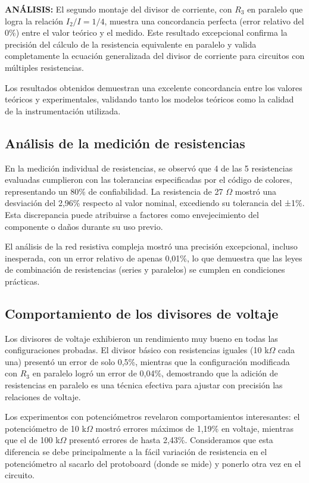 \documentclass[12pt,a4paper]{article}
\begin{document}
\textbf{ANÁLISIS:} El segundo montaje del divisor de corriente, con $R_3$ en paralelo que logra la relación $I_2/I = 1/4$, muestra una concordancia perfecta (error relativo del 0\%) entre el valor teórico y el medido. Este resultado excepcional confirma la precisión del cálculo de la resistencia equivalente en paralelo y valida completamente la ecuación generalizada del divisor de corriente para circuitos con múltiples resistencias.
\bigskip

\newpage
{}
Los resultados obtenidos demuestran una excelente concordancia entre los valores teóricos y experimentales, validando tanto los modelos teóricos como la calidad de la instrumentación utilizada.

\subsection{Análisis de la medición de resistencias}
En la medición individual de resistencias, se observó que 4 de las 5 resistencias evaluadas cumplieron con las tolerancias especificadas por el código de colores, representando un 80\% de confiabilidad. La resistencia de 27 $\Omega$ mostró una desviación del 2,96\% respecto al valor nominal, excediendo su tolerancia del ±1\%. Esta discrepancia puede atribuirse a factores como envejecimiento del componente o daños durante su uso previo.

El análisis de la red resistiva compleja mostró una precisión excepcional, incluso inesperada, con un error relativo de apenas 0,01\%, lo que demuestra que las leyes de combinación de resistencias (series y paralelos) se cumplen en condiciones prácticas.

\subsection{Comportamiento de los divisores de voltaje}
Los divisores de voltaje exhibieron un rendimiento muy bueno en todas las configuraciones probadas. El divisor básico con resistencias iguales (10 k$\Omega$ cada una) presentó un error de solo 0,5\%, mientras que la configuración modificada con $R_3$ en paralelo logró un error de 0,04\%, demostrando que la adición de resistencias en paralelo es una técnica efectiva para ajustar con precisión las relaciones de voltaje.

Los experimentos con potenciómetros revelaron comportamientos interesantes: el potenciómetro de 10 k$\Omega$ mostró errores máximos de 1,19\% en voltaje, mientras que el de 100 k$\Omega$ presentó errores de hasta 2,43\%. Consideramos que esta diferencia se debe principalmente a la fácil variación de resistencia en el potenciómetro al sacarlo del protoboard (donde se mide) y ponerlo otra vez en el circuito.
\end{document}
